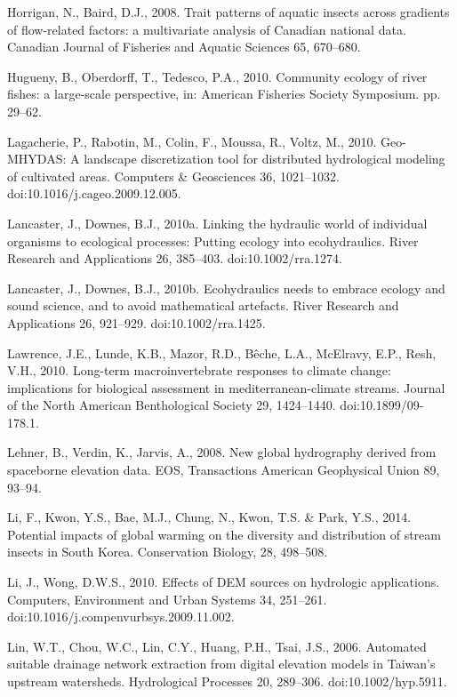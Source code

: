 \begin{thebibliography}
\bibitem{} \hangindent=1cm Horrigan, N., Baird, D.J., 2008. Trait patterns of aquatic insects across gradients of flow-related factors: a multivariate analysis of Canadian national data. Canadian Journal of Fisheries and Aquatic Sciences 65, 670–680.

\bibitem{} \hangindent=1cm Hugueny, B., Oberdorff, T., Tedesco, P.A., 2010. Community ecology of river fishes: a large-scale perspective, in: American Fisheries Society Symposium. pp. 29–62.

\bibitem{} \hangindent=1cm Lagacherie, P., Rabotin, M., Colin, F., Moussa, R., Voltz, M., 2010. Geo-MHYDAS: A landscape discretization tool for distributed hydrological modeling of cultivated areas. Computers & Geosciences 36, 1021–1032. doi:10.1016/j.cageo.2009.12.005.

\bibitem{} \hangindent=1cm Lancaster, J., Downes, B.J., 2010a. Linking the hydraulic world of individual organisms to ecological processes: Putting ecology into ecohydraulics. River Research and Applications 26, 385–403. doi:10.1002/rra.1274.

\bibitem{} \hangindent=1cm Lancaster, J., Downes, B.J., 2010b. Ecohydraulics needs to embrace ecology and sound science, and to avoid mathematical artefacts. River Research and Applications 26, 921–929. doi:10.1002/rra.1425.

\bibitem{} \hangindent=1cm Lawrence, J.E., Lunde, K.B., Mazor, R.D., Bêche, L.A., McElravy, E.P., Resh, V.H., 2010. Long-term macroinvertebrate responses to climate change: implications for biological assessment in mediterranean-climate streams. Journal of the North American Benthological Society 29, 1424–1440. doi:10.1899/09-178.1.

\bibitem{} \hangindent=1cm Lehner, B., Verdin, K., Jarvis, A., 2008. New global hydrography derived from spaceborne elevation data. EOS, Transactions American Geophysical Union 89, 93–94.

\bibitem{} \hangindent=1cm Li, F., Kwon, Y.S., Bae, M.J., Chung, N., Kwon, T.S. & Park, Y.S., 2014. Potential impacts of global warming on the diversity and distribution of stream insects in South Korea. Conservation Biology, 28, 498–508.

\bibitem{} \hangindent=1cm Li, J., Wong, D.W.S., 2010. Effects of DEM sources on hydrologic applications. Computers, Environment and Urban Systems 34, 251–261. doi:10.1016/j.compenvurbsys.2009.11.002.

\bibitem{} \hangindent=1cm Lin, W.T., Chou, W.C., Lin, C.Y., Huang, P.H., Tsai, J.S., 2006. Automated suitable drainage network extraction from digital elevation models in Taiwan’s upstream watersheds. Hydrological Processes 20, 289–306. doi:10.1002/hyp.5911.


\end{thebibliography}
